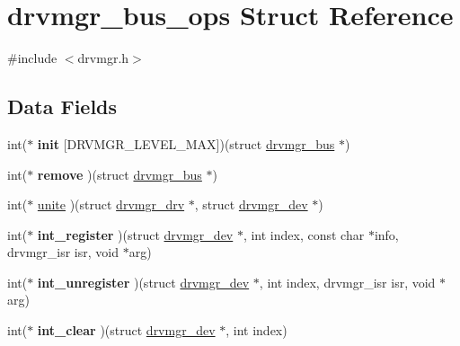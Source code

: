 \hypertarget{structdrvmgr__bus__ops}{}\section{drvmgr\+\_\+bus\+\_\+ops Struct Reference}
\label{structdrvmgr__bus__ops}


{\ttfamily \#include $<$drvmgr.\+h$>$}

\subsection*{Data Fields}
\begin{DoxyCompactItemize}
\item 
\mbox{\label{structdrvmgr__bus__ops_a732b9208816958703cdfca8481f5586b}} 
int($\ast$ {\bfseries init} \mbox{[}D\+R\+V\+M\+G\+R\+\_\+\+L\+E\+V\+E\+L\+\_\+\+M\+AX\mbox{]})(struct \mbox{\hyperlink{structdrvmgr__bus}{drvmgr\+\_\+bus}} $\ast$)
\item 
\mbox{\label{structdrvmgr__bus__ops_ae671f88ff489911abdbb807d2815936c}} 
int($\ast$ {\bfseries remove} )(struct \mbox{\hyperlink{structdrvmgr__bus}{drvmgr\+\_\+bus}} $\ast$)
\item 
int($\ast$ \mbox{\hyperlink{structdrvmgr__bus__ops_ac1aaf0f0581f7e816844a8eb622f54f8}{unite}} )(struct \mbox{\hyperlink{structdrvmgr__drv}{drvmgr\+\_\+drv}} $\ast$, struct \mbox{\hyperlink{structdrvmgr__dev}{drvmgr\+\_\+dev}} $\ast$)
\item 
\mbox{\label{structdrvmgr__bus__ops_a5a12a29ce1222c4abf5af8979984a63f}} 
int($\ast$ {\bfseries int\+\_\+register} )(struct \mbox{\hyperlink{structdrvmgr__dev}{drvmgr\+\_\+dev}} $\ast$, int index, const char $\ast$info, drvmgr\+\_\+isr isr, void $\ast$arg)
\item 
\mbox{\label{structdrvmgr__bus__ops_a73da1e62130742203514bc12a4e6f781}} 
int($\ast$ {\bfseries int\+\_\+unregister} )(struct \mbox{\hyperlink{structdrvmgr__dev}{drvmgr\+\_\+dev}} $\ast$, int index, drvmgr\+\_\+isr isr, void $\ast$arg)
\item 
\mbox{\label{structdrvmgr__bus__ops_aa621a529a3a939bbb9ae27d3836ff8e4}} 
int($\ast$ {\bfseries int\+\_\+clear} )(struct \mbox{\hyperlink{structdrvmgr__dev}{drvmgr\+\_\+dev}} $\ast$, int index)

\end{DoxyCompactItemize}

